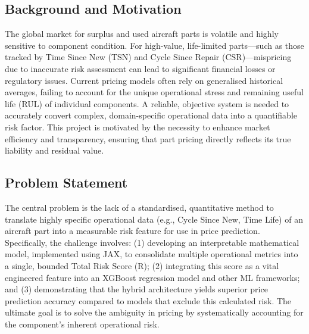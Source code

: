 \documentclass[12pt,a4paper]{article}
\begin{document}
\subsection{Background and Motivation}
The global market for surplus and used aircraft parts is volatile and highly sensitive to component condition. For high-value, life-limited parts—such as those tracked by Time Since New (TSN) and Cycle Since Repair (CSR)—mispricing due to inaccurate risk assessment can lead to significant financial losses or regulatory issues. Current pricing models often rely on generalised historical averages, failing to account for the unique operational stress and remaining useful life (RUL) of individual components. A reliable, objective system is needed to accurately convert complex, domain-specific operational data into a quantifiable risk factor. This project is motivated by the necessity to enhance market efficiency and transparency, ensuring that part pricing directly reflects its true liability and residual value.

\subsection{Problem Statement}
The central problem is the lack of a standardised, quantitative method to translate highly specific operational data (e.g., Cycle Since New, Time Life) of an aircraft part into a measurable risk feature for use in price prediction. Specifically, the challenge involves: (1) developing an interpretable mathematical model, implemented using JAX, to consolidate multiple operational metrics into a single, bounded Total Risk Score (R); (2) integrating this score as a vital engineered feature into an XGBoost regression model and other ML frameworks; and (3) demonstrating that the hybrid architecture yields superior price prediction accuracy compared to models that exclude this calculated risk. The ultimate goal is to solve the ambiguity in pricing by systematically accounting for the component's inherent operational risk.
\end{document}

